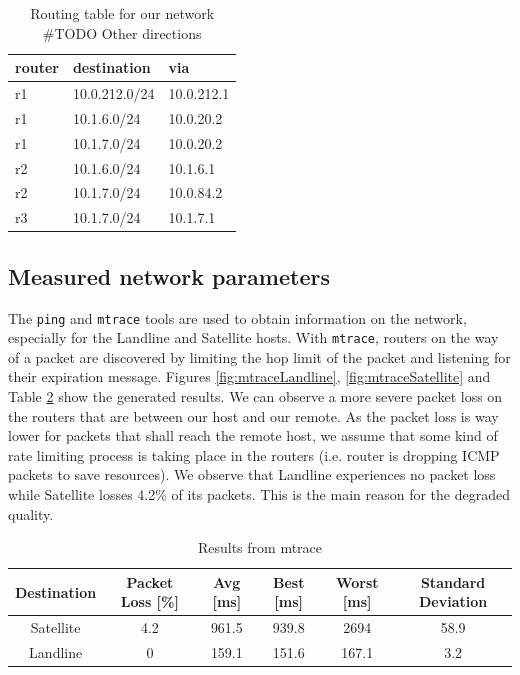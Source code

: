 \documentclass[parskip=full]{scrartcl}
\begin{document}
\begin{table}[hb]
    \centering
    \caption{Routing table for our network \#TODO Other directions}
    \label{tab:routing}
    \begin{tabular}{lll}
        \toprule
        \textbf{router} & \textbf{destination} & \textbf{via}  \\ \midrule
        r1 & 10.0.212.0/24 &  10.0.212.1 \\
        r1 & 10.1.6.0/24   &  10.0.20.2 \\
        r1 & 10.1.7.0/24   &  10.0.20.2 \\
        \midrule
        r2 & 10.1.6.0/24 & 10.1.6.1 \\
        r2 & 10.1.7.0/24 & 10.0.84.2 \\
        \midrule
        r3 & 10.1.7.0/24 & 10.1.7.1\\
        \bottomrule
    \end{tabular}
\end{table}

\subsection{Measured network parameters}

The \texttt{ping} and \texttt{mtrace} tools are used to obtain information on the network, especially for the Landline and Satellite hosts.
With \texttt{mtrace}, routers on the way of a packet are discovered by limiting the hop limit of the packet and listening for their expiration message.
Figures \ref{fig:mtraceLandline}, \ref{fig:mtraceSatellite} and Table \ref{tbl:mtraceResults} show the generated results.
We can observe a more severe packet loss on the routers that are between our host and our remote. 
As the packet loss is way lower for packets that shall reach the remote host, we assume that some kind of rate limiting process is taking place in the routers (i.e. router is dropping ICMP packets to save resources).
We observe that Landline experiences no packet loss while Satellite losses 4.2\% of its packets. 
This is the main reason for the degraded quality.

\begin{table}[hb]
    \centering
    \caption{Results from mtrace}
    \label{tbl:mtraceResults}
    \begin{tabular}{cccccc}
        \toprule
        Destination & Packet Loss [\%] & Avg [ms] & Best [ms] & Worst [ms] & Standard Deviation  \\ \midrule
        Satellite & 4.2 & 961.5 & 939.8 & 2694 & 58.9 \\
        Landline & 0 & 159.1 & 151.6 & 167.1 & 3.2\\
        \bottomrule
    \end{tabular}
\end{table}
\end{document}
